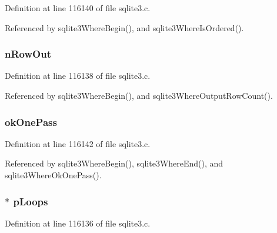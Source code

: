 Definition at line 116140 of file sqlite3.\+c.



Referenced by sqlite3\+Where\+Begin(), and sqlite3\+Where\+Is\+Ordered().

\hypertarget{struct_where_info_a6fd57be53ea38aadf6e9ace68b69e5f4}{}
\subsubsection[{n\+Row\+Out}]{ n\+Row\+Out}\label{struct_where_info_a6fd57be53ea38aadf6e9ace68b69e5f4}


Definition at line 116138 of file sqlite3.\+c.



Referenced by sqlite3\+Where\+Begin(), and sqlite3\+Where\+Output\+Row\+Count().

\hypertarget{struct_where_info_a79b229978a938c5d68d5088122298771}{}
\subsubsection[{ok\+One\+Pass}]{ ok\+One\+Pass}\label{struct_where_info_a79b229978a938c5d68d5088122298771}


Definition at line 116142 of file sqlite3.\+c.



Referenced by sqlite3\+Where\+Begin(), sqlite3\+Where\+End(), and sqlite3\+Where\+Ok\+One\+Pass().

\hypertarget{struct_where_info_a5dc3b6e81d69f5436019b6cc3746e068}{}
\subsubsection[{p\+Loops}]{$\ast$ p\+Loops}\label{struct_where_info_a5dc3b6e81d69f5436019b6cc3746e068}


Definition at line 116136 of file sqlite3.\+c.

\hypertarget{struct_where_info_a9150e506e5902e336130c9764caf96a0}{}
